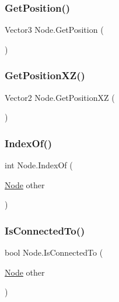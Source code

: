 \mbox{\label{class_node_aba752b203dcf1360d6a9ef80deabd98e}} 
\subsubsection{\texorpdfstring{Get\+Position()}{GetPosition()}}
{\footnotesize\ttfamily Vector3 Node.\+Get\+Position (\begin{DoxyParamCaption}{ }\end{DoxyParamCaption})}

\mbox{\label{class_node_a1173e5e173312924b2d0d399bf18e246}} 
\subsubsection{\texorpdfstring{Get\+Position\+X\+Z()}{GetPositionXZ()}}
{\footnotesize\ttfamily Vector2 Node.\+Get\+Position\+XZ (\begin{DoxyParamCaption}{ }\end{DoxyParamCaption})}

\mbox{\label{class_node_adfa9ae31ba9f758335618f4928d9d4a0}} 
\subsubsection{\texorpdfstring{Index\+Of()}{IndexOf()}}
{\footnotesize\ttfamily int Node.\+Index\+Of (\begin{DoxyParamCaption}\item[{\mbox{\hyperlink{class_node}{Node}}}]{other }\end{DoxyParamCaption})}

\mbox{\label{class_node_acf505ea93da66cff664d7195d64c4a5b}} 
\subsubsection{\texorpdfstring{Is\+Connected\+To()}{IsConnectedTo()}}
{\footnotesize\ttfamily bool Node.\+Is\+Connected\+To (\begin{DoxyParamCaption}\item[{\mbox{\hyperlink{class_node}{Node}}}]{other }\end{DoxyParamCaption})}

